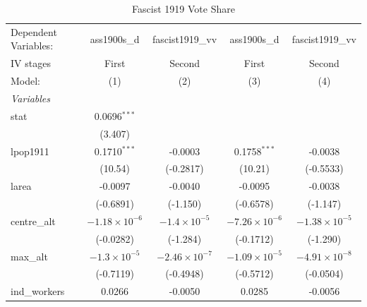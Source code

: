 
\begin{table}[htbp]
   \caption{Fascist 1919 Vote Share}
   \centering
   \begin{tabular}{lcccc}
      \tabularnewline \midrule \midrule
      Dependent Variables:             & ass1900s\_d            & fascist1919\_vv        & ass1900s\_d            & fascist1919\_vv\\   
      IV stages                        & First                  & Second                 & First                  & Second \\   
      Model:                           & (1)                    & (2)                    & (3)                    & (4)\\  
      \midrule
      \emph{Variables}\\
      stat                             & 0.0696$^{***}$         &                        &                        &   \\   
                                       & (3.407)                &                        &                        &   \\   
      lpop1911                         & 0.1710$^{***}$         & -0.0003                & 0.1758$^{***}$         & -0.0038\\   
                                       & (10.54)                & (-0.2817)              & (10.21)                & (-0.5533)\\   
      larea                            & -0.0097                & -0.0040                & -0.0095                & -0.0038\\   
                                       & (-0.6891)              & (-1.150)               & (-0.6578)              & (-1.147)\\   
      centre\_alt                      & $-1.18\times 10^{-6}$  & $-1.4\times 10^{-5}$   & $-7.26\times 10^{-6}$  & $-1.38\times 10^{-5}$\\    
                                       & (-0.0282)              & (-1.284)               & (-0.1712)              & (-1.290)\\   
      max\_alt                         & $-1.3\times 10^{-5}$   & $-2.46\times 10^{-7}$  & $-1.09\times 10^{-5}$  & $-4.91\times 10^{-8}$\\    
                                       & (-0.7119)              & (-0.4948)              & (-0.5712)              & (-0.0504)\\   
      ind\_workers                     & 0.0266                 & -0.0050                & 0.0285                 & -0.0056\\   

\end{tabular}
\end{table}
